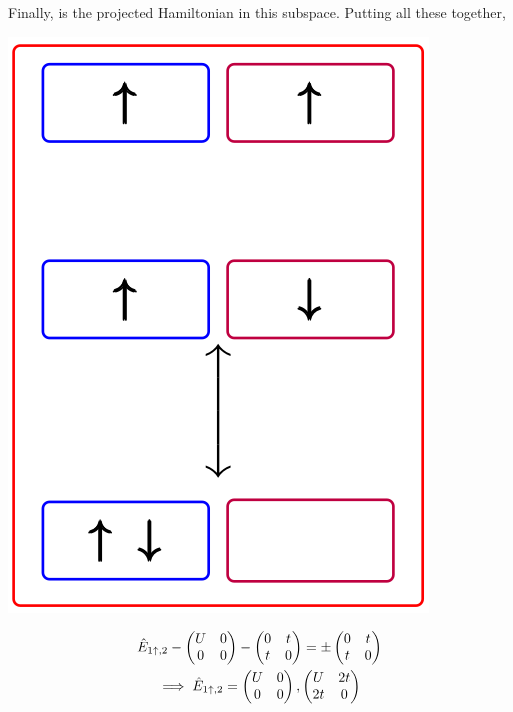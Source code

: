 \documentclass[12pt]{article}
\begin{document}
\begin{itemize}
\begin{minipage}{\textwidth/2}
\eeq
Finally,  is the projected Hamiltonian in this subspace. Putting all these together,
\end{minipage}
\hspace*{60pt}
\begin{minipage}{\textwidth/3}
	\includegraphics[scale=0.3]{pic1.png}
\end{minipage}
\begin{gather}
\hat E_{1\ua,2} - \begin{pmatrix} U & 0 \\ 0 & 0 \end{pmatrix} - \begin{pmatrix}0 & t \\ t & 0 \end{pmatrix} = \pm \begin{pmatrix} 0 & t \\ t & 0 \end{pmatrix}\\
\implies \hat E_{1\ua,2} = \begin{pmatrix} U & 0  \\ 0 & 0 \end{pmatrix} , \begin{pmatrix} U & 2t \\ 2t & 0 \end{pmatrix}

\end{gather}
\end{itemize}
\end{document}
